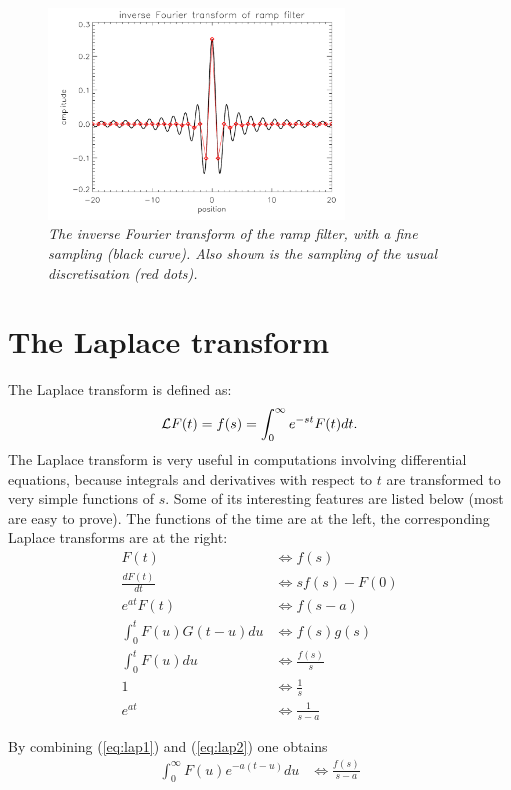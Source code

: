 \begin{figure}[tb]
\centering
\includegraphics[width=0.7\textwidth]{figs/fig_rampfilter_app.pdf}
\caption{\label{fig:rampapp} \emph{The inverse Fourier transform of
    the ramp filter, with a fine sampling (black curve). Also shown is
    the sampling of the usual discretisation (red dots).}}
\end{figure}


\newpage
\section{The Laplace transform} \label{app:laplace}
The Laplace transform is defined as:
\begin{equation}
  {\cal L} F(t) = f(s) = \int_0^\infty e^{-st} F(t) dt.
\end{equation}
%
The Laplace transform is very useful in computations involving differential
equations, because integrals and derivatives with respect to $t$ are
transformed to very simple functions of $s$. Some of its interesting features
are listed below (most are easy to prove). The functions of the time are at
the left, the corresponding Laplace transforms are at the right:
\begin{align}
F(t)                        & \Longleftrightarrow f(s) \\
\frac{dF(t)}{dt}            & \Longleftrightarrow s f(s) - F(0) \\
e^{at} F(t)                 & \Longleftrightarrow f(s - a)\\
\int_0^t F(u) G(t - u) du   & \Longleftrightarrow f(s) g(s) \label{eq:lap1}\\
\int_0^t F(u) du            & \Longleftrightarrow \frac{f(s)}{s}\\
1                           & \Longleftrightarrow \frac{1}{s}\\
e^{at}                      & \Longleftrightarrow \frac{1}{s - a} \label{eq:lap2}
\end{align}

By combining (\ref{eq:lap1}) and (\ref{eq:lap2}) one obtains
\begin{align}
\int_0^\infty F(u) e^{-a(t - u)} du & \Longleftrightarrow \frac{f(s)}{s-a}
\end{align}